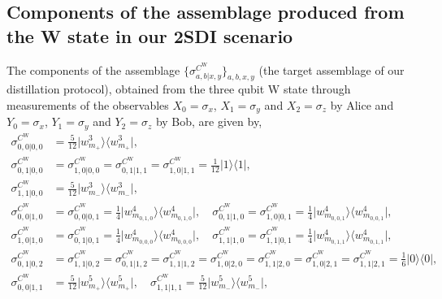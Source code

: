 \documentclass[reprint,superscriptaddress,nofootinbib,amsmath,amssymb,aps,pra,longbibliography]{revtex4-1}
\begin{document}
\begin{widetext}
\section{Components of the assemblage produced from the W state in our 2SDI scenario}\label{W2Sassemblage}

 The components of the assemblage $\{\sigma_{a,b|x,y}^{C^{\text{W}}}\}_{a,b,x,y}$ (the target assemblage of our distillation protocol), obtained from the three qubit W state through measurements of the observables $X_0= \sigma_x$, $X_1=\sigma_y$ and $X_2=\sigma_z$ by Alice and $Y_0= \sigma_x$, $Y_1=\sigma_y$ and $Y_2=\sigma_z$ by Bob, are given by,
\begin{align}
	\sigma_{0,0|0,0}^{C^{\text{W}}} &= \frac{5}{12}\Big| w_{m_{+}}^3 \Big\rangle \Big\langle w_{m_{+}}^3 \Big|, \nonumber \\
	\sigma_{0,1|0,0}^{C^{\text{W}}} &=\sigma_{1,0|0,0}^{C^{\text{W}}} = \sigma_{0,1|1,1}^{C^{\text{W}}} = \sigma_{1,0|1,1}^{C^{\text{W}}} = \frac{1}{12}\Big| 1 \Big\rangle \Big\langle 1 \Big|, \nonumber \\
	\sigma_{1,1|0,0}^{C^{\text{W}}} &= \frac{5}{12}\Big| w_{m_{-}}^3 \Big\rangle \Big\langle w_{m_{-}}^3 \Big|, \nonumber \\
	  \sigma_{0,0|1,0}^{C^{\text{W}}} &=  \sigma_{0,0|0,1}^{C^{\text{W}}} = \frac{1}{4}\Big| w_{m_{0,1,0}}^4 \Big\rangle \Big\langle w_{m_{0,1,0}}^4 \Big|, \quad \sigma_{0,1|1,0}^{C^{\text{W}}} = \sigma_{1,0|0,1} ^{C^{\text{W}}}  = \frac{1}{4}\Big| w_{m_{0,0,1}}^4 \Big\rangle \Big\langle w_{m_{0,0,1}}^4 \Big|, \, \nonumber \\
	\sigma_{1,0|1,0}^{C^{\text{W}}} &= \sigma_{0,1|0,1}^{C^{\text{W}}} = \frac{1}{4}\Big| w_{m_{0,0,0}}^4 \Big\rangle \Big\langle w_{m_{0,0,0}}^4 \Big|, \quad \sigma_{1,1|1,0}^{C^{\text{W}}} = \sigma_{1,1|0,1}^{C^{\text{W}}} = \frac{1}{4} \Big| w_{m_{0,1,1}}^4 \Big\rangle \Big\langle w_{m_{0,1,1}}^4 \Big|,\nonumber \\ 
	\sigma_{0,1|0,2}^{C^{\text{W}}}&=\sigma_{1,1|0,2}^{C^{\text{W}}}=\sigma_{0,1|1,2}^{C^{\text{W}}} = \sigma_{1,1|1,2}^{C^{\text{W}}} = \sigma_{1,0|2,0}^{C^{\text{W}}} = \sigma_{1,1|2,0}^{C^{\text{W}}} = \sigma_{1,0|2,1}^{C^{\text{W}}}=\sigma_{1,1|2,1}^{C^{\text{W}}}= \frac{1}{6} \Big| 0 \Big\rangle \Big\langle 0 \Big|, \nonumber \\
\sigma_{0,0|1,1}^{C^{\text{W}}} &=  \frac{5}{12} \Big| w_{m_{+}}^5 \Big\rangle \Big\langle w_{m_{+}}^5 \Big|, \quad  \sigma_{1,1|1,1}^{C^{\text{W}}} =  \frac{5}{12} \Big| w_{m_{-}}^5 \Big\rangle \Big\langle w_{m_{-}}^5 \Big| , \nonumber \\

\end{align}
\end{widetext}
\end{document}
